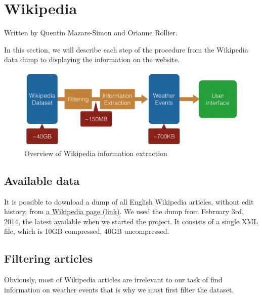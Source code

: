 

%
\section{Wikipedia}
Written by Quentin Mazars-Simon and Orianne Rollier.

In this section, we will describe each step of the procedure from the Wikipedia data dump to displaying the information on the website.
\begin{figure}[H]
    \includegraphics[width=\textwidth]{figures/wiki-flow.png}
    \caption{Overview of Wikipedia information extraction}
     \label{fig:wikiflow}
\end{figure}
\subsection{Available data}
It is possible to download a dump of all English Wikipedia articles, without edit history, from \href{https://meta.wikimedia.org/wiki/Data_dump_torrents#enwiki}{a Wikipedia page (link)}. We used the dump from February 3rd, 2014, the latest available when we started the project. It consists of a single XML file, which is 10GB compressed, 40GB uncompressed. 
\subsection{Filtering articles}
Obviously, most of Wikipedia articles are irrelevant to our task of find information on weather events that is why we must first filter the dataset. 
